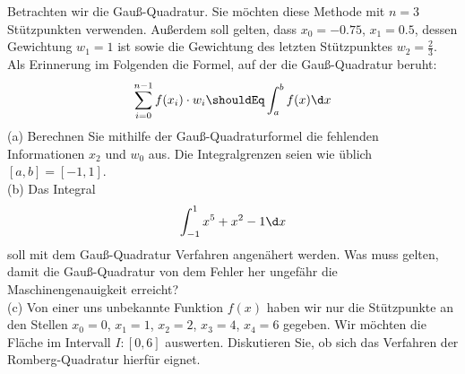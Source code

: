 \documentclass{scrartcl}
\begin{document}
	
	Betrachten wir die Gauß-Quadratur. Sie möchten diese Methode mit $n=3$ Stützpunkten verwenden. Außerdem soll gelten, dass $x_0 = -0.75$, $x_1 = 0.5$, dessen Gewichtung $w_1 = 1$ ist sowie die Gewichtung des letzten Stützpunktes $w_2 = \frac{2}{3}$.
	\n 
	Als Erinnerung im Folgenden die Formel, auf der die Gauß-Quadratur beruht:
	\begin{align*} 
		\sum_{i=0}^{n-1}f(x_i)\cdot w_i \shouldEq \int_{a}^{b}f(x) \d x 
	\end{align*}
	(a)
	Berechnen Sie mithilfe der Gauß-Quadraturformel die fehlenden Informationen $x_2$ und $w_0$ aus. Die Integralgrenzen seien wie üblich $[a,b] = [-1,1]$.
	\lbreak
	\\
	(b)
	Das Integral 
	\begin{align*}
		\int_{-1}^{1} x^5 + x^2 -1 \d x
	\end{align*}
	soll mit dem Gauß-Quadratur Verfahren angenähert werden. Was muss gelten, damit die Gauß-Quadratur von dem Fehler her ungefähr die Maschinengenauigkeit erreicht?
	\lbreak
	\\
	(c) 
	Von einer uns unbekannte Funktion $f(x)$ haben wir nur die Stützpunkte an den Stellen $x_0 = 0$, $x_1 = 1$, $x_2 = 2$, $x_3 = 4$, $x_4 = 6$ gegeben. Wir möchten die Fläche im Intervall $I: [0, 6]$ auswerten. Diskutieren Sie, ob sich das Verfahren der Romberg-Quadratur hierfür eignet.
	
\end{document}

